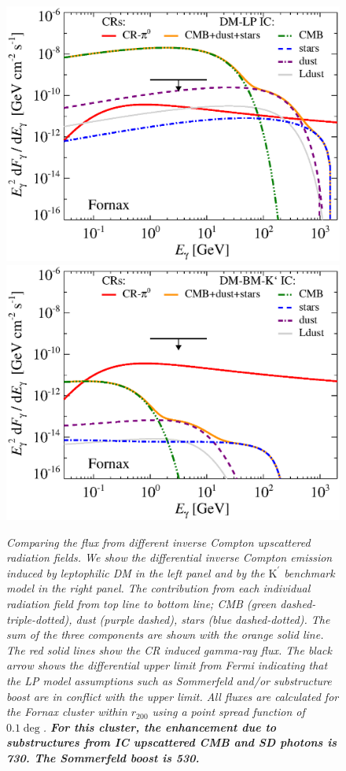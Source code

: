 \documentclass[10pt,aps,pra,reprint,amsmath,amsfonts,amssymb,showpacs,nofootinbib,floatfix]{revtex4-1}
\def\del#1{{}}
\def\C#1{{\bf #1}}
\newcommand{\rmn}{\mathrm}
\newcommand{\Kp}{\rmn{K}^\prime}
\newcommand{\rvir}{r_{200}}
\begin{document}
\begin{figure}
\begin{minipage}{2.0\columnwidth}
\includegraphics[width=0.49\columnwidth]{figures/flux.IRcomp.v13.0.1deg.1.6T.SubMass.elmu.SF700.noMW.woGal.eps}
\includegraphics[width=0.49\columnwidth]{figures/flux.IRcomp.BMv13.0.1deg.SubMass.noMW.woGal.eps}
\caption{\it Comparing the flux from different inverse Compton
  upscattered radiation fields. We show the differential inverse
  Compton emission induced by leptophilic DM in the left panel and by
  the $\Kp$ benchmark model in the right panel. The contribution from
  each individual radiation field from top line to bottom line; CMB
  (green dashed-triple-dotted), dust (purple dashed), stars (blue
  dashed-dotted). The sum of the three components are shown with the
  orange solid line.  The red solid lines show the CR induced
  gamma-ray flux. The black arrow shows the differential upper limit
  from Fermi \protect \cite{2010ApJ...717L..71A} indicating that the
  LP model assumptions such as Sommerfeld and/or substructure boost
  are in conflict with the upper limit. \del{We also show projected
    CTA point source sensitivities ($5\sigma$, 50h).}  All fluxes are
  calculated for the Fornax cluster within $\rvir$ using a point
  spread function of $0.1\deg$.\C{ For this cluster, the enhancement
    due to substructures from IC upscattered CMB and SD photons is
    730. The Sommerfeld boost is 530.}}
 \label{fig:IR_comp}
\end{minipage}
\end{figure}
\end{document}
